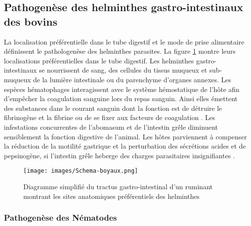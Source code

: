 \subsection{Pathogenèse des helminthes gastro-intestinaux des bovins}

La localisation préférentielle dans le tube digestif et le mode de prise alimentaire 
définissent le pathologenèse des helminthes parasites. La figure 
\ref{fig:diagramme_tractus_digestif} montre leurs localisations préférentielles dans le 
tube digestif.  Les helminthes gastro-intestinaux se nourrissent de sang, des cellules 
du tissus muqueux et sub-muqueux de la lumière intestinale ou du parenchyme d'organes 
annexes. Les espèces hématophages interagissent avec le système hémostatique de l'hôte 
afin d'empêcher la coagulation sanguine lors du repas sanguin. Ainsi elles émettent des 
substances dans le courant sanguin dont la fonction est de détruire le fibrinogène et 
la fibrine ou de se fixer aux facteurs de coagulation . Les infestations 
concurrentes de l'abomasum et de l'intestin grêle diminuent sensiblement la fonction 
digestive de l'animal. Les hôtes parviennent à compenser la réduction de la motilité 
gastrique et la perturbation des sécrétions acides et de pepsinogène, si l'intestin 
grêle heberge des charges parasitaires insignifiantes .

\begin{figure}[!ht]
	\centering
	\texttt{[image: images/Schema-boyaux.png]}
	\caption [Diagramme simplifié du tractus gastro-intestinal d'un ruminant montrant les 
	sites anatomiques préférentiels des helminthes]{Diagramme simplifié du tractus 
	gastro-intestinal d'un ruminant montrant les sites anatomiques préférentiels des 
	helminthes}
	\label{fig:diagramme_tractus_digestif}
\end{figure}

\subsubsection{Pathogenèse des Nématodes}

